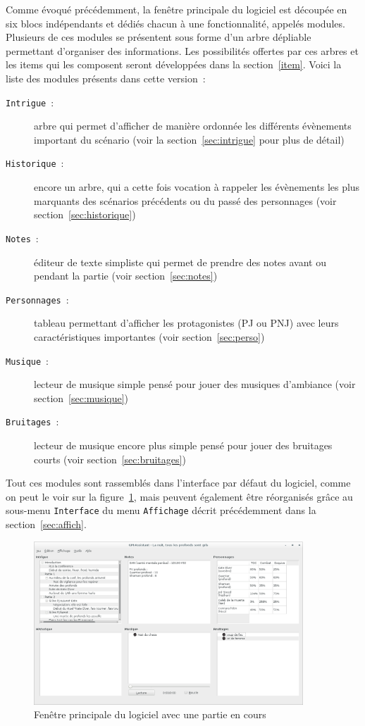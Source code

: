 \documentclass[a4paper,12pt]{article}
\newcommand*{\interfaceitem}[1]{\texttt{#1}}
\newcommand*{\guillemets}[1]{\og #1\fg{}\xspace}
\begin{document}
Comme évoqué précédemment, la fenêtre principale du logiciel est découpée en six blocs indépendants et dédiés chacun à une fonctionnalité, appelés modules.
Plusieurs de ces modules se présentent sous forme d'un arbre \guillemets{dépliable} permettant d'organiser des informations.
Les possibilités offertes par ces arbres et les items qui les composent seront développées dans la section~\ref{item}.
Voici la liste des modules présents dans cette version~:
\begin{description}
    \item[\interfaceitem{Intrigue}~:]{arbre qui permet d'afficher de manière ordonnée les différents évènements important du scénario (voir la section~\ref{sec:intrigue} pour plus de détail)}
    \item[\interfaceitem{Historique}~:]{encore un arbre, qui a cette fois vocation à rappeler les évènements les plus marquants des scénarios précédents ou du passé des personnages (voir section~\ref{sec:historique})}
    \item[\interfaceitem{Notes}~:]{éditeur de texte simpliste qui permet de prendre des notes avant ou pendant la partie (voir section~\ref{sec:notes})}
    \item[\interfaceitem{Personnages}~:]{tableau permettant d'afficher les protagonistes (PJ ou PNJ) avec leurs caractéristiques importantes (voir section~\ref{sec:perso})}
    \item[\interfaceitem{Musique}~:]{lecteur de musique simple pensé pour jouer des musiques d'ambiance (voir section~\ref{sec:musique})}
    \item[\interfaceitem{Bruitages}~:]{lecteur de musique encore plus simple pensé pour jouer des bruitages courts (voir section~\ref{sec:bruitages})}
\end{description}
Tout ces modules sont rassemblés dans l'interface par défaut du logiciel, comme on peut le voir sur la figure~\ref{fig:interface}, mais peuvent également être réorganisés grâce au sous-menu \interfaceitem{Interface} du menu \interfaceitem{Affichage} décrit précédemment dans la section~\ref{sec:affich}.
\begin{figure}[ht]
    \centerline{\includegraphics[width=0.9\textwidth]{scenario_complet}}
    \caption{Fenêtre principale du logiciel avec une partie en cours}
    \label{fig:interface}
\end{figure}
\end{document}
